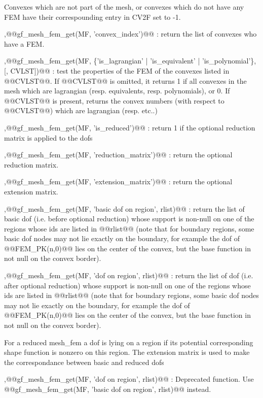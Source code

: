 \begin{cmddescription}
  Convexes which are not part of the mesh, or convexes which do not
  have any FEM have their correspounding entry in CV2F set to -1.

  \sep{@@gf\_mesh\_fem\_get(MF, 'convex\_index')@@} : 
  return the list of convexes who have a FEM.

  \sep{@@gf\_mesh\_fem\_get(MF, \{'is\_lagrangian' | 'is\_equivalent' |
    'is\_polynomial'\},[, CVLST])@@} :
   test
  the properties of the FEM of the convexes listed in @@CVLST@@.  If
  @@CVLST@@ is omitted, it returns 1 if all convexes in the mesh which
  are lagrangian (resp.  equivalents, resp. polynomials), or 0.  If
  @@CVLST@@ is present, returns the convex numbers (with respect to
  @@CVLST@@) which are lagrangian (resp. etc..)

  \sep{@@gf\_mesh\_fem\_get(MF, 'is\_reduced')@@} : 
  return 1 if the optional reduction matrix is applied to the dofs

  \sep{@@gf\_mesh\_fem\_get(MF, 'reduction\_matrix')@@} : 
  return the optional reduction matrix.

  \sep{@@gf\_mesh\_fem\_get(MF, 'extension\_matrix')@@} : 
  return the optional extension matrix.

  \sep{@@gf\_mesh\_fem\_get(MF, 'basic dof on region', rlist)@@} : return the
  list of basic dof (i.e. before optional reduction) whose support is
  non-null on one of the regions whose
  ids are listed in @@rlist@@ (note that for boundary regions, some
  basic dof nodes may not lie exactly on the boundary, for example the dof
  of @@FEM_PK(n,0)@@ lies on the center of the convex, but the base
  function in not null on the convex border).

  \sep{@@gf\_mesh\_fem\_get(MF, 'dof on region', rlist)@@} : return the
  list of dof (i.e. after optional reduction) whose support is
  non-null on one of the regions whose
  ids are listed in @@rlist@@ (note that for boundary regions, some
  basic dof nodes may not lie exactly on the boundary, for example the dof
  of @@FEM_PK(n,0)@@ lies on the center of the convex, but the base
  function in not null on the convex border).
  
  For a reduced mesh\_fem
  a dof is lying on a region if its potential corresponding shape
  function is nonzero on this region. The extension matrix is used
  to make the correspondance between basic and reduced dofs

  \sep{@@gf\_mesh\_fem\_get(MF, 'dof on region', rlist)@@} : Deprecated
  function. Use @@gf\_mesh\_fem\_get(MF, 'basic dof on region', rlist)@@ instead.


\end{cmddescription}
